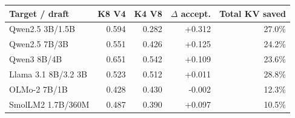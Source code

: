 \begin{tabular}{lrrrr}
\toprule
Target / draft & K8 V4 & K4 V8 & $\Delta$ accept. & Total KV saved \\
\midrule
Qwen2.5 3B/1.5B & 0.594 & 0.282 & +0.312 & 27.0\% \\
Qwen2.5 7B/3B & 0.551 & 0.426 & +0.125 & 24.2\% \\
Qwen3 8B/4B & 0.651 & 0.542 & +0.109 & 23.6\% \\
Llama 3.1 8B/3.2 3B & 0.523 & 0.512 & +0.011 & 28.8\% \\
OLMo-2 7B/1B & 0.428 & 0.430 & -0.002 & 12.3\% \\
SmolLM2 1.7B/360M & 0.487 & 0.390 & +0.097 & 10.5\% \\
\bottomrule
\end{tabular}
